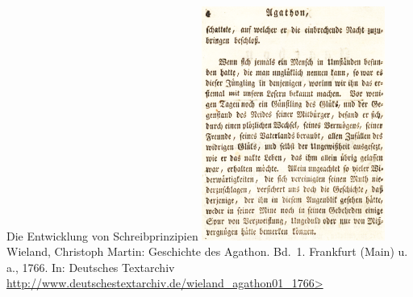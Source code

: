 \begin{frame}
  {Die Entwicklung von Schreibprinzipien}
  \centering
  \includegraphics[width=0.45\textwidth]{graphics/agathon2e}\\[0.5\baselineskip]
  {\tiny Wieland, Christoph Martin: Geschichte des Agathon. Bd.\ 1. Frankfurt (Main) u.\,a., 1766. In: Deutsches Textarchiv\\[-1\baselineskip]
    \url{http://www.deutschestextarchiv.de/wieland_agathon01_1766>}}
\end{frame}

